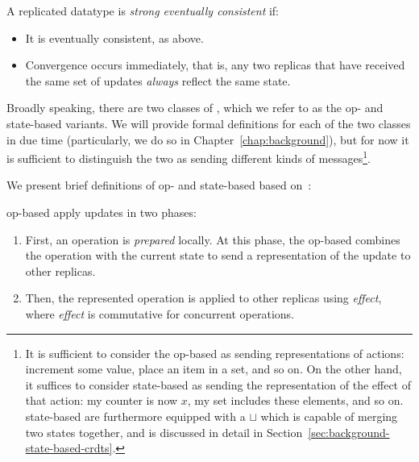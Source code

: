 \begin{definition}
  A replicated datatype is \textit{strong eventually consistent} if:
  \begin{itemize}
    \item It is eventually consistent, as above.
    \item Convergence occurs immediately, that is, any two replicas that have
      received the same set of updates \textit{always} reflect the same state.
  \end{itemize}
\end{definition}

Broadly speaking, there are two classes of \CRDTs, which we refer to as the op-
and state-based variants. We will provide formal definitions for each of the two
classes in due time (particularly, we do so in Chapter~\ref{chap:background}),
but for now it is sufficient to distinguish the two as sending different kinds
of messages\footnote{It is sufficient to consider the op-based \CRDT as sending
representations of actions: increment some value, place an item in a set, and so
on. On the other hand, it suffices to consider state-based \CRDTs as sending the
representation of the effect of that action: my counter is now $x$, my set
includes these elements, and so on. state-based \CRDTs are furthermore equipped
with a $\sqcup$ which is capable of merging two states together, and is
discussed in detail in Section~\ref{sec:background-state-based-crdts}.}.

We present brief definitions of op- and state-based \CRDTs based
on~\citep{baquero14}:

\begin{definition}
  op-based \CRDTs apply updates in two phases:
  \begin{enumerate}
    \item First, an operation is \textit{prepared} locally. At this phase, the
      op-based \CRDT combines the operation with the current state to send a
      representation of the update to other replicas.
    \item Then, the represented operation is applied to other replicas using
      \textit{effect}, where \textit{effect} is commutative for concurrent
      operations.
  \end{enumerate}
\end{definition}

